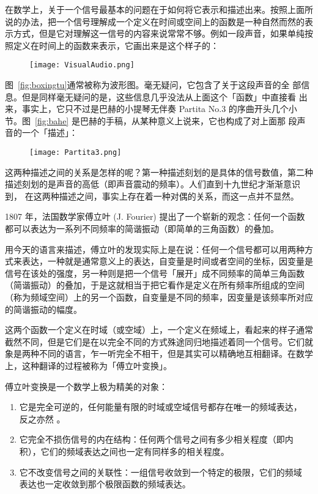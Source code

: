 在数学上，关于一个信号最基本的问题在于如何将它表示和描述出来。按照上面所
说的办法，把一个信号理解成一个定义在时间或空间上的函数是一种自然而然的表
示方式，但是它对理解这一信号的内容来说常常不够。例如一段声音，如果单纯按
照定义在时间上的函数来表示，它画出来是这个样子的：

\begin{figure}[htbp]
  \centering
  \texttt{[image: VisualAudio.png]}
  \vspace{0.2cm}
\end{figure}

图~\ref{fig:boxingtu}通常被称为波形图。毫无疑问，它包含了关于这段声音的全
部信息。但是同样毫无疑问的是，这些信息几乎没法从上面这个「函数」中直接看
出来，事实上，它只不过是巴赫的小提琴无伴奏 Partita No.3 的序曲开头几个小
节。图~\ref{fig:bahe} 是巴赫的手稿，从某种意义上说来，它也构成了对上面那
段声音的一个「描述」：

\begin{figure}[htbp]
  \centering
  \texttt{[image: Partita3.png]}
  \vspace{0.2cm}
\end{figure}

这两种描述之间的关系是怎样的呢？第一种描述刻划的是具体的信号数值，第二种
描述刻划的是声音的高低（即声音震动的频率）。人们直到十九世纪才渐渐意识到，
在这两种描述之间，事实上存在着一种对偶的关系，而这一点并不显然。

1807 年，法国数学家傅立叶 (J. Fourier) 提出了一个崭新的观念：任何一个函数
都可以表达为一系列不同频率的简谐振动（即简单的三角函数）的叠加。

用今天的语言来描述，傅立叶的发现实际上是在说：任何一个信号都可以用两种方
式来表达，一种就是通常意义上的表达，自变量是时间或者空间的坐标，因变量是
信号在该处的强度，另一种则是把一个信号「展开」成不同频率的简单三角函数
（简谐振动）的叠加，于是这就相当于把它看作是定义在所有频率所组成的空间
（称为频域空间）上的另一个函数，自变量是不同的频率，因变量是该频率所对应
的简谐振动的幅度。


这两个函数一个定义在时域（或空域）上，一个定义在频域上，看起来的样子通常
截然不同，但是它们是在以完全不同的方式殊途同归地描述着同一个信号。它们就
象是两种不同的语言，乍一听完全不相干，但是其实可以精确地互相翻译。在数学
上，这种翻译的过程被称为「傅立叶变换」。

傅立叶变换是一个数学上极为精美的对象：
\begin{enumerate}
\item 它是完全可逆的，任何能量有限的时域或空域信号都存在唯一的频域表达，
  反之亦然 。
\item 它完全不损伤信号的内在结构：任何两个信号之间有多少相关程度（即内
  积），它们的频域表达之间也一定有同样多的相关程度。
\item 它不改变信号之间的关联性：一组信号收敛到一个特定的极限，它们的频域
  表达也一定收敛到那个极限函数的频域表达。
\end{enumerate}

